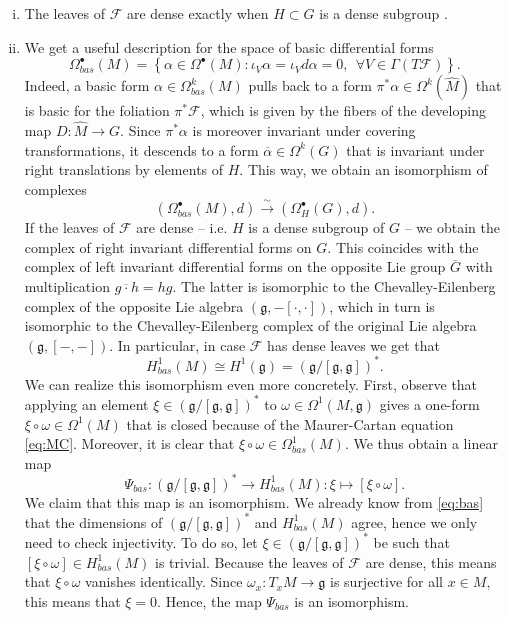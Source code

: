 \documentclass[11pt, letterpaper, oneside,reqno]{amsart}
\theoremstyle{plain}
\theoremstyle{underline}
\theoremstyle{definition}
\theoremstyle{remark}
\begin{document}
	\begin{enumerate}[i)] 
	\item The leaves of $\mathcal{F}$ are dense exactly when $H\subset G$ is a dense subgroup  \cite[Lemma~4.23]{Moerdijk}.
	\item We get a useful description for the space of basic differential forms
	\[
	\Omega^{\bullet}_{bas}(M)=\left\{\alpha\in\Omega^{\bullet}(M):\iota_V\alpha=\iota_V d\alpha=0,\ \ \forall V\in\Gamma(T\mathcal{F})\right\}.
	\]
	Indeed, a basic form $\alpha\in \Omega^{k}_{bas}(M)$ pulls back to a form $\pi^{*}\alpha\in\Omega^{k}(\widehat{M})$ that is basic for the foliation $\pi^{*}\mathcal{F}$, which is given by the fibers of the developing map $D:\widehat{M}\rightarrow G$. Since $\pi^{*}\alpha$ is moreover invariant under covering transformations, it descends to a form $\overline{\alpha}\in\Omega^{k}(G)$ that is invariant under right translations by elements of $H$. This way, we obtain an isomorphism of complexes
	\[
	\left(\Omega^{\bullet}_{bas}(M),d\right)\overset{\sim}{\longrightarrow}\left(\Omega_{H}^{\bullet}(G),d\right).
	\]
	If the leaves of $\mathcal{F}$ are dense -- i.e. $H$ is a dense subgroup of $G$ -- we obtain the complex of right invariant differential forms on $G$. This coincides with the complex of left invariant differential forms on the opposite Lie group $\overline{G}$ with multiplication $g\overline{\cdot}h =hg$. The latter is isomorphic to the Chevalley-Eilenberg complex of the opposite Lie algebra $(\mathfrak{g},-[\cdot,\cdot])$, which in turn is isomorphic to the Chevalley-Eilenberg complex of the original Lie algebra $(\mathfrak{g},[-,-])$. In particular, in case $\mathcal{F}$ has dense leaves we get that
	\begin{equation}\label{eq:bas}
	H^{1}_{bas}(M)\cong H^{1}(\mathfrak{g})=(\mathfrak{g}/[\mathfrak{g},\mathfrak{g}])^{*}.
	\end{equation}
	 We can realize this isomorphism even more concretely. First, observe that applying an element $\xi\in(\mathfrak{g}/[\mathfrak{g},\mathfrak{g}])^{*}$ to $\omega\in\Omega^{1}(M,\mathfrak{g})$ gives a one-form $\xi\circ\omega\in\Omega^{1}(M)$ that is closed because of the Maurer-Cartan equation \eqref{eq:MC}. Moreover, it is clear that $\xi\circ\omega\in\Omega^{1}_{bas}(M)$. 
	We thus obtain a linear map
	\begin{equation}\label{eq:psi}
		\Psi_{bas}:(\mathfrak{g}/[\mathfrak{g},\mathfrak{g}])^{*}\longrightarrow H^{1}_{bas}(M):\xi\mapsto [\xi\circ\omega].
	\end{equation}
	We claim that this map is an isomorphism. We already know from \eqref{eq:bas} that the dimensions of $(\mathfrak{g}/[\mathfrak{g},\mathfrak{g}])^{*}$ and $H^{1}_{bas}(M)$ agree, hence we only need to check injectivity. To do so, let $\xi\in(\mathfrak{g}/[\mathfrak{g},\mathfrak{g}])^{*}$ be such that $[\xi\circ\omega]\in H^{1}_{bas}(M)$ is trivial. Because the leaves of $\mathcal{F}$ are dense, this means that $\xi\circ\omega$ vanishes identically. Since $\omega_x:T_{x}M\rightarrow\mathfrak{g}$ is surjective for all $x\in M$, this means that $\xi=0$. Hence, the map $\Psi_{bas}$ is an isomorphism.
	\end{enumerate}
	
\end{document}
